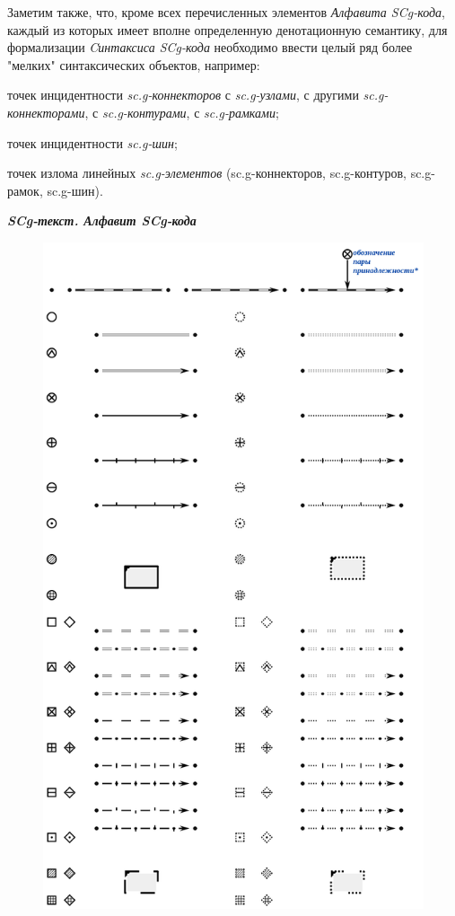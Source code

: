 Заметим также, что, кроме всех перечисленных элементов \textit{Алфавита SCg-кода\scnsupergroupsign}, каждый из которых имеет вполне определенную денотационную семантику, для формализации \textit{Cинтаксиса SCg-кода} необходимо ввести целый ряд более "мелких"{} синтаксических объектов, например:
\begin{textitemize}
	\item точек инцидентности \textit{sc.g-коннекторов} с \textit{sc.g-узлами}, с другими \textit{sc.g-коннекторами}, с \textit{sc.g-контурами}, с \textit{sc.g-рамками};
	\item точек инцидентности \textit{sc.g-шин};
	\item точек излома линейных \textit{sc.g-элементов} (sc.g-коннекторов, sc.g-контуров, sc.g-рамок, sc.g-шин).
\end{textitemize}

\newpage

\textbf{\textit{SCg-текст. Алфавит SCg-кода\scnsupergroupsign}}

\begin{figure}[h]
	\centering
	\includegraphics[scale=0.8]{images/intro/scg/SCg-full.png}
\end{figure}


